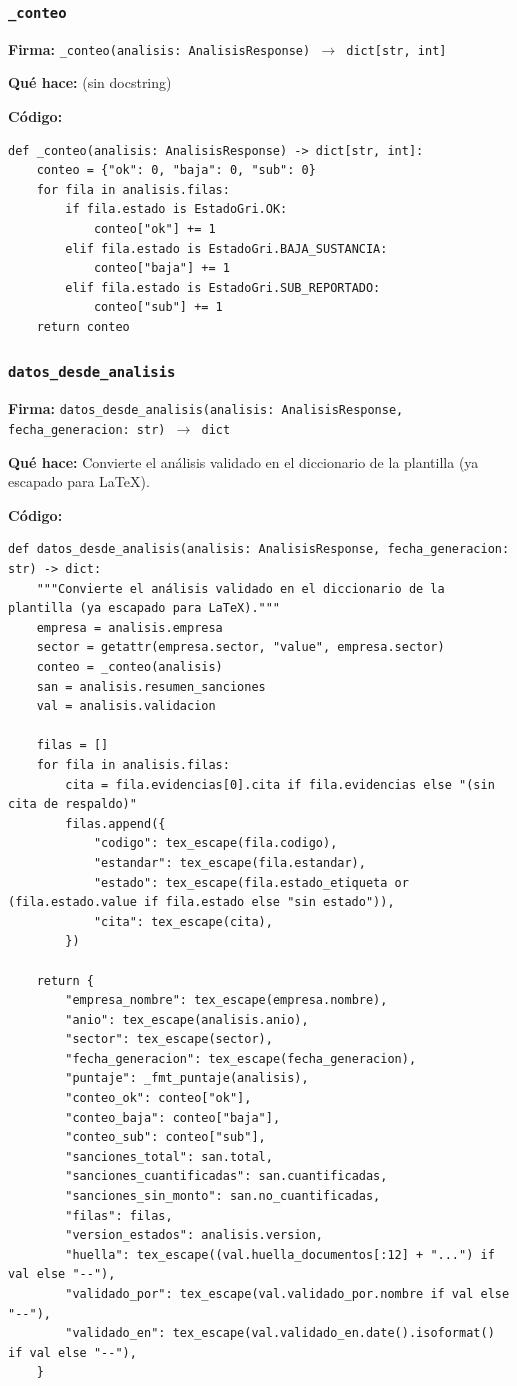 \documentclass[11pt,a4paper]{article}
\begin{document}
\subsubsection*{\texttt{\_conteo}}
\textbf{Firma:} \texttt{\_conteo(analisis: AnalisisResponse) $\rightarrow$ dict[str, int]}

\textbf{Qué hace:} (sin docstring)

\textbf{Código:}
\begin{lstlisting}
def _conteo(analisis: AnalisisResponse) -> dict[str, int]:
    conteo = {"ok": 0, "baja": 0, "sub": 0}
    for fila in analisis.filas:
        if fila.estado is EstadoGri.OK:
            conteo["ok"] += 1
        elif fila.estado is EstadoGri.BAJA_SUSTANCIA:
            conteo["baja"] += 1
        elif fila.estado is EstadoGri.SUB_REPORTADO:
            conteo["sub"] += 1
    return conteo
\end{lstlisting}

\subsubsection*{\texttt{datos\_desde\_analisis}}
\textbf{Firma:} \texttt{datos\_desde\_analisis(analisis: AnalisisResponse, fecha\_generacion: str) $\rightarrow$ dict}

\textbf{Qué hace:} Convierte el análisis validado en el diccionario de la plantilla (ya escapado para LaTeX).

\textbf{Código:}
\begin{lstlisting}
def datos_desde_analisis(analisis: AnalisisResponse, fecha_generacion: str) -> dict:
    """Convierte el análisis validado en el diccionario de la plantilla (ya escapado para LaTeX)."""
    empresa = analisis.empresa
    sector = getattr(empresa.sector, "value", empresa.sector)
    conteo = _conteo(analisis)
    san = analisis.resumen_sanciones
    val = analisis.validacion

    filas = []
    for fila in analisis.filas:
        cita = fila.evidencias[0].cita if fila.evidencias else "(sin cita de respaldo)"
        filas.append({
            "codigo": tex_escape(fila.codigo),
            "estandar": tex_escape(fila.estandar),
            "estado": tex_escape(fila.estado_etiqueta or (fila.estado.value if fila.estado else "sin estado")),
            "cita": tex_escape(cita),
        })

    return {
        "empresa_nombre": tex_escape(empresa.nombre),
        "anio": tex_escape(analisis.anio),
        "sector": tex_escape(sector),
        "fecha_generacion": tex_escape(fecha_generacion),
        "puntaje": _fmt_puntaje(analisis),
        "conteo_ok": conteo["ok"],
        "conteo_baja": conteo["baja"],
        "conteo_sub": conteo["sub"],
        "sanciones_total": san.total,
        "sanciones_cuantificadas": san.cuantificadas,
        "sanciones_sin_monto": san.no_cuantificadas,
        "filas": filas,
        "version_estados": analisis.version,
        "huella": tex_escape((val.huella_documentos[:12] + "...") if val else "--"),
        "validado_por": tex_escape(val.validado_por.nombre if val else "--"),
        "validado_en": tex_escape(val.validado_en.date().isoformat() if val else "--"),
    }
\end{lstlisting}
\end{document}
